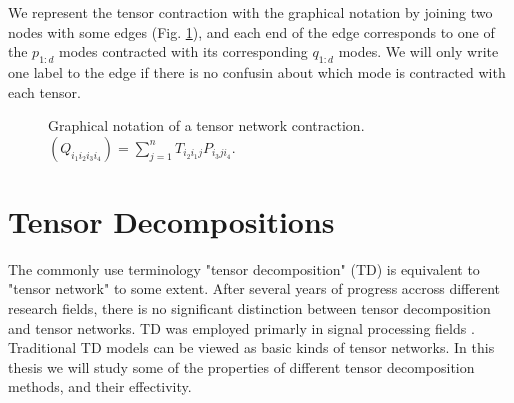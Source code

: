 \documentclass[11pt,a4paper,openright,oneside]{book}
\numberwithin{equation}{section}
\begin{document}
We represent the tensor contraction with the graphical notation by joining two nodes with some edges (Fig. \ref{fig:tcont}), and
each end of the edge corresponds to one of the $p_{1:d}$ modes contracted with its corresponding $q_{1:d}$ modes.
We will only write one label to the edge if there is no confusin about which mode is contracted with each tensor.

\begin{figure}[h]
    \centering
        \caption{
            Graphical notation of a tensor network contraction.
            $(Q_{i_1i_2i_3i_4}) = \sum_{j=1}^{n} T_{i_2i_1j} P_{i_3ji_4}$.
        }
    \label{fig:tcont}
\end{figure}


\chapter{Tensor Decompositions}

The commonly use terminology "tensor decomposition" (TD) is equivalent to "tensor network" to some extent. After
several years of progress accross different research fields, there is no significant distinction between tensor decomposition
and tensor networks. TD was employed primarly in signal processing fields \cite{wangTensorNetworksMeet2023}. Traditional TD models can be viewed
as basic kinds of tensor networks. In this thesis we will study some of the properties of different tensor decomposition methods,
and their effectivity.
\end{document}
